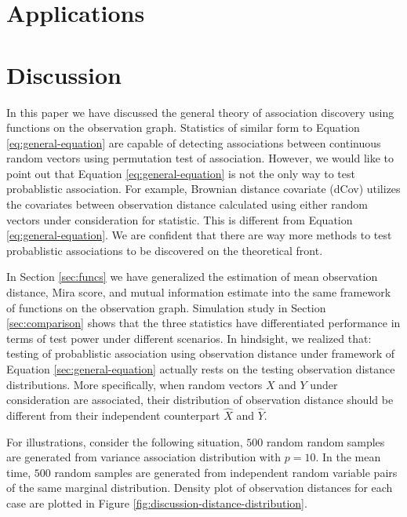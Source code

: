 \documentclass{sig-alternate}
\begin{document}
\section{Applications}
\label{sec:haha}


\section{Discussion}
\label{sec:discussion}

In this paper we have discussed the general theory of association
discovery using functions on the observation graph. Statistics of
similar form to Equation \ref{eq:general-equation} are capable of
detecting associations between continuous random vectors using
permutation test of association. However, we would like to point out
that Equation \ref{eq:general-equation} is not the only way to test
probablistic association. For example, Brownian distance covariate
(dCov) utilizes the covariates between observation distance calculated
using either random vectors under consideration for statistic. This is
different from Equation \ref{eq:general-equation}. We are confident
that there are way more methods to test probablistic associations to
be discovered on the theoretical front.

In Section \ref{sec:funcs} we have generalized the estimation of mean
observation distance, Mira score, and mutual information estimate into
the same framework of functions on the observation graph. Simulation
study in Section \ref{sec:comparison} shows that the three statistics
have differentiated performance in terms of test power under different
scenarios. In hindsight, we realized that: testing of probablistic
association using observation distance under framework of Equation
\ref{sec:general-equation} actually rests on the testing observation
distance distributions. More specifically, when random vectors $X$ and
$Y$ under consideration are associated, their distribution of
observation distance should be different from their independent
counterpart $\hat{X}$ and $\hat{Y}$. 

For illustrations, consider the following situation, $500$ random
\iid{} random samples are generated from variance association
distribution with $p=10$. In the mean time, $500$ random samples are
generated from independent random variable pairs of the same marginal
distribution. Density plot of observation distances for each case are
plotted in Figure \ref{fig:discussion-distance-distribution}. 
\end{document}
